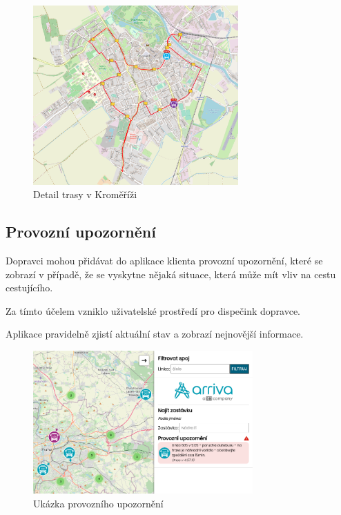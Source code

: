 \begin{figure}[H]
    \centering
    \includegraphics[width=0.7\textwidth]{images/krom_line_6.png}
    \caption{Detail trasy v Kroměříži}
    \label{trasa}
\end{figure}

\subsection{Provozní upozornění}
Dopravci mohou přidávat do aplikace klienta provozní upozornění, které se zobrazí v případě, že se vyskytne nějaká situace, která může mít vliv na cestu cestujícího.\par
Za tímto účelem vzniklo uživatelské prostředí pro dispečink dopravce.

Aplikace pravidelně zjistí aktuální stav a zobrazí nejnovější informace.

\par
\begin{figure}[H]
    \centering
    \includegraphics[width=0.75\textwidth]{images/global_arriva_event.png}
    \caption{Ukázka provozního upozornění}
    \label{upozorneni}
\end{figure}

